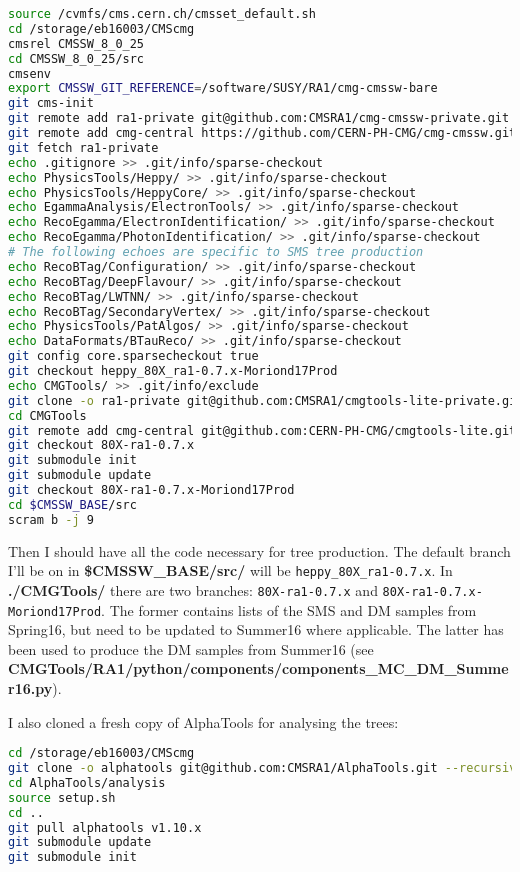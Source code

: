 \begin{lstlisting}[belowskip=-0.7cm, language=sh]
source /cvmfs/cms.cern.ch/cmsset_default.sh
cd /storage/eb16003/CMScmg
cmsrel CMSSW_8_0_25
cd CMSSW_8_0_25/src
cmsenv
export CMSSW_GIT_REFERENCE=/software/SUSY/RA1/cmg-cmssw-bare
git cms-init
git remote add ra1-private git@github.com:CMSRA1/cmg-cmssw-private.git
git remote add cmg-central https://github.com/CERN-PH-CMG/cmg-cmssw.git
git fetch ra1-private
echo .gitignore >> .git/info/sparse-checkout
echo PhysicsTools/Heppy/ >> .git/info/sparse-checkout
echo PhysicsTools/HeppyCore/ >> .git/info/sparse-checkout
echo EgammaAnalysis/ElectronTools/ >> .git/info/sparse-checkout
echo RecoEgamma/ElectronIdentification/ >> .git/info/sparse-checkout
echo RecoEgamma/PhotonIdentification/ >> .git/info/sparse-checkout
# The following echoes are specific to SMS tree production
echo RecoBTag/Configuration/ >> .git/info/sparse-checkout
echo RecoBTag/DeepFlavour/ >> .git/info/sparse-checkout
echo RecoBTag/LWTNN/ >> .git/info/sparse-checkout
echo RecoBTag/SecondaryVertex/ >> .git/info/sparse-checkout
echo PhysicsTools/PatAlgos/ >> .git/info/sparse-checkout
echo DataFormats/BTauReco/ >> .git/info/sparse-checkout
git config core.sparsecheckout true
git checkout heppy_80X_ra1-0.7.x-Moriond17Prod
echo CMGTools/ >> .git/info/exclude
git clone -o ra1-private git@github.com:CMSRA1/cmgtools-lite-private.git CMGTools
cd CMGTools
git remote add cmg-central git@github.com:CERN-PH-CMG/cmgtools-lite.git
git checkout 80X-ra1-0.7.x
git submodule init
git submodule update
git checkout 80X-ra1-0.7.x-Moriond17Prod
cd $CMSSW_BASE/src
scram b -j 9
\end{lstlisting}
 
Then I should have all the code necessary for tree production. The default branch I'll be on in \textbf{\$CMSSW\_BASE/src/} will be \texttt{heppy\_80X\_ra1-0.7.x}. In \textbf{./CMGTools/} there are two branches: \texttt{80X-ra1-0.7.x} and \texttt{80X-ra1-0.7.x-Moriond17Prod}. The former contains lists of the SMS and DM samples from Spring16, but need to be updated to Summer16 where applicable. The latter has been used to produce the DM samples from Summer16 (see \textbf{CMGTools/RA1/python/components/components\_MC\_DM\_Summer16.py}).

I also cloned a fresh copy of AlphaTools for analysing the trees:

\begin{lstlisting}[belowskip=-0.7cm, language=sh, numbers=none]
cd /storage/eb16003/CMScmg
git clone -o alphatools git@github.com:CMSRA1/AlphaTools.git --recursive
cd AlphaTools/analysis
source setup.sh
cd ..
git pull alphatools v1.10.x
git submodule update
git submodule init
\end{lstlisting}

